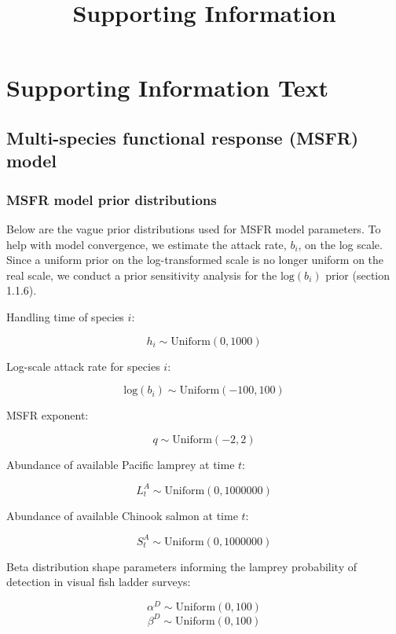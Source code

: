 \documentclass[
]{article}
\title{Supporting Information}
\author{}
\date{\vspace{-2.5em}}
\begin{document}
\maketitle

{
\setcounter{tocdepth}{2}
\tableofcontents
}
\newpage

\section{Supporting Information Text}\label{supporting-information-text}

\subsection{Multi-species functional response (MSFR)
model}\label{multi-species-functional-response-msfr-model}

\subsubsection{MSFR model prior
distributions}\label{msfr-model-prior-distributions}

Below are the vague prior distributions used for MSFR model parameters.
To help with model convergence, we estimate the attack rate, \(b_i\), on
the log scale. Since a uniform prior on the log-transformed scale is no
longer uniform on the real scale, we conduct a prior sensitivity
analysis for the \(\text{log}(b_i)\) prior (section 1.1.6).

Handling time of species \(i\):

\[
h_i \sim \text{Uniform}(0, 1000)
\]

Log-scale attack rate for species \(i\):

\[
\text{log}(b_i) \sim \text{Uniform}(-100, 100)
\]

MSFR exponent:

\[
q \sim \text{Uniform}(-2, 2)
\]

Abundance of available Pacific lamprey at time \(t\):

\[
L_t^A \sim \text{Uniform}(0, 1000000)
\]

Abundance of available Chinook salmon at time \(t\):

\[
S_t^A \sim \text{Uniform}(0, 1000000)
\]

Beta distribution shape parameters informing the lamprey probability of
detection in visual fish ladder surveys:

\[
\alpha^D \sim \text{Uniform}(0, 100)
\] \[
\beta^D \sim \text{Uniform}(0, 100)
\]
\end{document}
